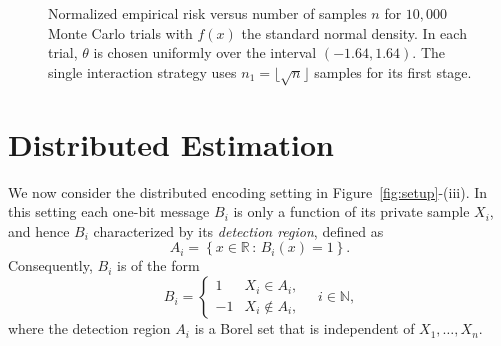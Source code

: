 \documentclass[letterpaper, 11pt]{IEEEtran}      %
\begin{document}
\begin{figure}
\begin{center}
\caption{Normalized empirical risk versus number of samples $n$ for $10,000$ Monte Carlo trials with $f(x)$ the standard normal density. In each trial, $\theta$ is chosen uniformly over the interval $(-1.64,1.64)$. The single interaction strategy uses $n_1 = \lfloor \sqrt{n} \rfloor$ samples for its first stage. 
\label{fig:adaptive_error}  }
\end{center}
\end{figure}

\section{Distributed Estimation \label{sec:distributed}}
We now consider the distributed encoding setting in Figure~\ref{fig:setup}-(iii). In this setting each one-bit message $B_i$ is only a function of its private sample $X_i$, and hence $B_i$ characterized by its \emph{detection region}, defined as 
\[
A_i = \left\{ x \in \mathbb R \,:\, B_i(x) = 1 \right\}.
\]
Consequently, $B_i$ is of the form
\[
B_i = \begin{cases} 1 & X_i \in A_i, \\
-1 & X_i \notin A_i,
\end{cases} \quad i\in \mathbb N,
\]
where the detection region $A_i$ is a Borel set that is independent of $X_1,\ldots,X_n$.\\
\end{document}
